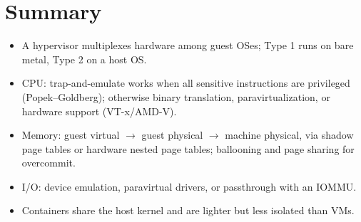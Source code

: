\section*{Summary}
\begin{itemize}
  \item A hypervisor multiplexes hardware among guest OSes; Type 1 runs on bare metal, Type 2 on
    a host OS.
  \item CPU: trap-and-emulate works when all sensitive instructions are privileged
    (Popek--Goldberg); otherwise binary translation, paravirtualization, or hardware support
    (VT-x/AMD-V).
  \item Memory: guest virtual $\to$ guest physical $\to$ machine physical, via shadow page
    tables or hardware nested page tables; ballooning and page sharing for overcommit.
  \item I/O: device emulation, paravirtual drivers, or passthrough with an IOMMU.
  \item Containers share the host kernel and are lighter but less isolated than VMs.
\end{itemize}
